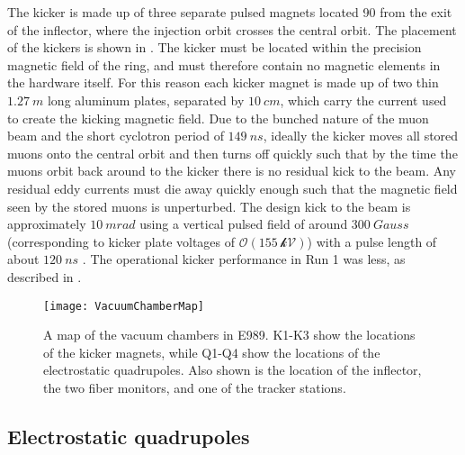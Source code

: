 The kicker is made up of three separate pulsed magnets located 90\textdegree{} from the exit of the inflector, where the injection orbit crosses the central orbit. The placement of the kickers is shown in . The kicker must be located within the precision magnetic field of the ring, and must therefore contain no magnetic elements in the hardware itself. For this reason each kicker magnet is made up of two thin $\SI{1.27}{m}$ long aluminum plates, separated by $\SI{10}{cm}$, which carry the current used to create the kicking magnetic field. Due to the bunched nature of the muon beam and the short cyclotron period of $\SI{149}{ns}$, ideally the kicker moves all stored muons onto the central orbit and then turns off quickly such that by the time the muons orbit back around to the kicker there is no residual kick to the beam. Any residual eddy currents must die away quickly enough such that the magnetic field seen by the stored muons is unperturbed. The design kick to the beam is approximately $\SI{10}{mrad}$ using a vertical pulsed field of around $\SI{300}{Gauss}$ (corresponding to kicker plate voltages of $\mathcal{O(\SI{155}{kV})}$) with a pulse length of about $\SI{120}{ns}$ \cite{TDR}. The operational kicker performance in Run 1 was less, as described in .



\begin{figure}[]
    \centering
    \texttt{[image: VacuumChamberMap]}
    \caption[Vacuum chamber map]{A map of the vacuum chambers in E989. K1-K3 show the locations of the kicker magnets, while Q1-Q4 show the locations of the electrostatic quadrupoles. Also shown is the location of the inflector, the two fiber monitors, and one of the tracker stations.}   
    \label{fig:vacmap}
\end{figure}

\subsection{Electrostatic quadrupoles}
\label{sub:quads}


